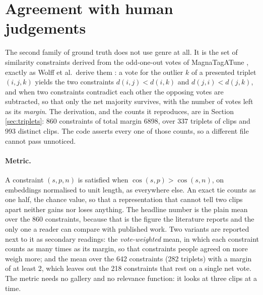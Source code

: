 \section{Agreement with human judgements}
\label{sec:triplet-protocol}

The second family of ground truth does not use genre at all. It is the set of
similarity constraints derived from the odd-one-out votes of MagnaTagATune
\cite{Law2009}, exactly as Wolff et al.\ derive them \cite{Wolff2012}: a vote
for the outlier $k$ of a presented triplet $(i, j, k)$ yields the two
constraints $d(i,j) < d(i,k)$ and $d(j,i) < d(j,k)$, and when two constraints
contradict each other the opposing votes are subtracted, so that only the net
majority survives, with the number of votes left as its \emph{margin}. The
derivation, and the counts it reproduces, are in Section \ref{sec:triplets}:
860 constraints of total margin 6898, over 337 triplets of clips and 993
distinct clips. The code asserts every one of those counts, so a different
file cannot pass unnoticed.

\paragraph{Metric.} A constraint $(s, p, n)$ is satisfied when
$\cos(s, p) > \cos(s, n)$, on embeddings normalised to unit length, as
everywhere else. An exact tie counts as one half, the chance value, so that a
representation that cannot tell two clips apart neither gains nor loses
anything. The headline number is the plain mean over the 860 constraints,
because that is the figure the literature reports and the only one a reader
can compare with published work. Two variants are reported next to it as
secondary readings: the \emph{vote-weighted} mean, in which each constraint
counts as many times as its margin, so that constraints people agreed on more
weigh more; and the mean over the 642 constraints (282 triplets) with a margin
of at least 2, which leaves out the 218 constraints that rest on a single net
vote. The metric needs no gallery and no relevance function: it looks at three
clips at a time.

